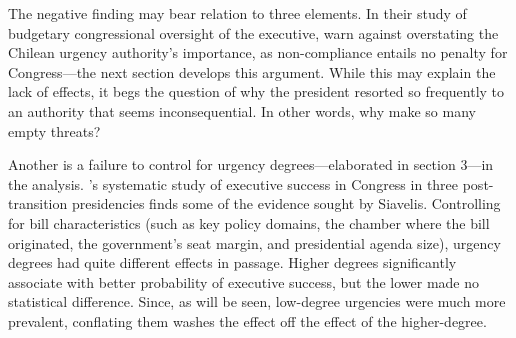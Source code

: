 \documentclass[letter,12pt]{article}
\begin{document}
The negative finding may bear relation to three elements. In their study of budgetary congressional oversight of the executive, \citet{berrios.gamboa.fiscChile.2006} warn against overstating the Chilean urgency authority's importance, as non-compliance entails no penalty for Congress---the next section develops this argument. While this may explain the lack of effects, it begs the question of why the president resorted so frequently to an authority that seems inconsequential. In other words, why make so many empty threats?

Another is a failure to control for urgency degrees---elaborated in section 3---in the analysis. \citeauthor{aleman.navia.UrgChi.2009}'s \citeyearpar{aleman.navia.UrgChi.2009} systematic study of executive success in Congress in three post-transition presidencies finds some of the evidence sought by Siavelis. Controlling for bill characteristics (such as key policy domains, the chamber where the bill originated, the government's seat margin, and presidential agenda size), urgency degrees had quite different effects in passage. Higher degrees significantly associate with better probability of executive success, but the lower made no statistical difference. Since, as will be seen, low-degree urgencies were much more prevalent, conflating them washes the effect off the effect of the higher-degree. 

\end{document}
